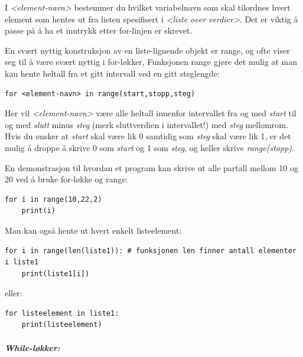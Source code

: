 \documentclass[%
oneside,                 %
final,                   %
10pt,norsk]{article}
\begin{document}
I \emph{<element-navn>} bestemmer du hvilket variabelnavn som skal tilordnes hvert element som hentes ut fra listen spesifisert i \emph{<liste over verdier>}.
Det er viktig å passe på å ha et inntrykk etter for-linjen er skrevet.


\vspace{3mm}


En svært nyttig konstruksjon av en liste-lignende objekt er range, og ofte viser seg til å være svært nyttig i for-løkker,
Funksjonen range gjøre det mulig at man kan hente heltall fra et gitt intervall ved en gitt steglengde:
\begin{verbatim}
for <element-navn> in range(start,stopp,steg)
\end{verbatim}
Her vil \emph{<element-navn>} være alle heltall innenfor intervallet fra og med \emph{start} til og med \emph{slutt} minus \emph{steg} (merk sluttverdien i intervallet!) med \emph{steg} mellomrom. Hvis du ønsker at \emph{start} skal være lik 0 samtidig som \emph{steg} skal være lik 1, er
det mulig å droppe å skrive 0 som \emph{start} og 1 som \emph{steg}, og heller skrive \emph{range(stopp)}.

En demonstrasjon til hvordan et program kan skrive ut alle partall mellom 10 og 20 ved å bruke for-løkke og range:
\begin{verbatim}
for i in range(10,22,2)
    print(i)
\end{verbatim}

Man kan også hente ut hvert enkelt listeelement:
\begin{verbatim}
for i in range(len(liste1)): # funksjonen len finner antall elementer i liste1
    print(liste1[i])
\end{verbatim}
eller:
\begin{verbatim}
for listeelement in liste1:
    print(listeelement)
\end{verbatim}


\vspace{3mm}


\paragraph{\textit{While-løkker:}}
\end{document}
